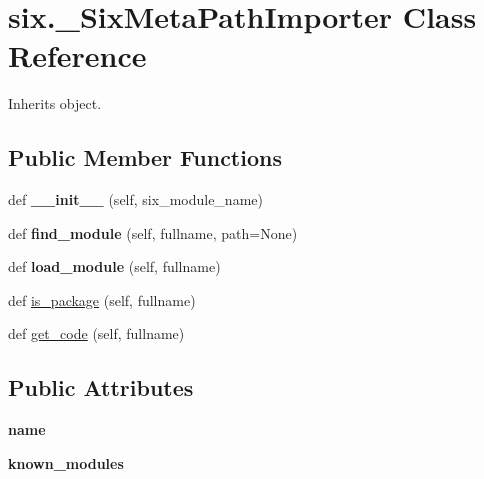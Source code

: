 \hypertarget{classsix_1_1___six_meta_path_importer}{}\section{six.\+\_\+\+Six\+Meta\+Path\+Importer Class Reference}
\label{classsix_1_1___six_meta_path_importer}


Inherits object.

\subsection*{Public Member Functions}
\begin{DoxyCompactItemize}
\item 
\mbox{\label{classsix_1_1___six_meta_path_importer_af0274fb3033e7c7668e90a5acf89547a}} 
def {\bfseries \+\_\+\+\_\+init\+\_\+\+\_\+} (self, six\+\_\+module\+\_\+name)
\item 
\mbox{\label{classsix_1_1___six_meta_path_importer_a12a22cc298daa6af519256715c9b7d43}} 
def {\bfseries find\+\_\+module} (self, fullname, path=None)
\item 
\mbox{\label{classsix_1_1___six_meta_path_importer_aa1d439f07783884d4d9856b82b82061d}} 
def {\bfseries load\+\_\+module} (self, fullname)
\item 
def \hyperlink{classsix_1_1___six_meta_path_importer_a442b9688b6f1dac8cfdc6d622b0a191d}{is\+\_\+package} (self, fullname)
\item 
def \hyperlink{classsix_1_1___six_meta_path_importer_af17c478b4ec0437d4d86d040295261f9}{get\+\_\+code} (self, fullname)
\end{DoxyCompactItemize}
\subsection*{Public Attributes}
\begin{DoxyCompactItemize}
\item 
\mbox{\label{classsix_1_1___six_meta_path_importer_ab3f5fb09f8ab79a506e1d32303df0c7b}} 
{\bfseries name}
\item 
\mbox{\label{classsix_1_1___six_meta_path_importer_a3ea28c1798d43286a56ecb40e14ef106}} 
{\bfseries known\+\_\+modules}
\end{DoxyCompactItemize}
